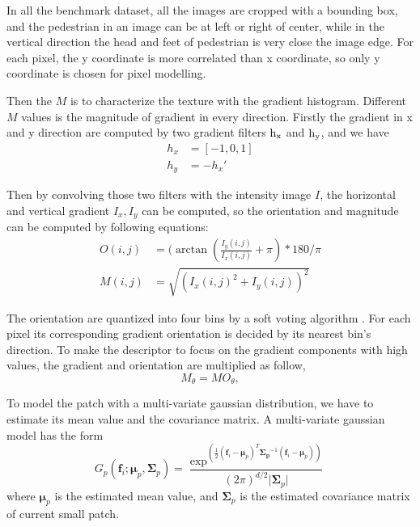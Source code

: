 In all the benchmark dataset, all the images are cropped with a bounding box, and the pedestrian in an image can be at left or right of center, while in the vertical direction the head and feet of pedestrian is very close the image edge. For each pixel, the y coordinate is more correlated than x coordinate, so only y coordinate is chosen for pixel modelling. 

Then the $M$ is to characterize the texture with the gradient histogram. Different $M$ values is the magnitude of gradient in every direction. 
Firstly the gradient in x and y direction are computed by two gradient filters $\rm{h}_x$ and $\rm{h}_y$, and we have 
\begin{equation}
\begin{aligned}
h_x &= [-1, 0, 1]\\
h_y &= -h_x'
\end{aligned}
\end{equation}

Then by convolving those two filters with the intensity image $I$, the horizontal and vertical gradient $I_x, I_y$ can be computed, so the orientation and magnitude can be computed by following equations:
\begin{equation}
\begin{aligned}
O(i,j) &= (\arctan(\frac{I_y(i,j)}{I_x(i,j)}+\pi)*180 /{\pi} \\
M(i,j) &= \sqrt{(I_x(i,j)^2 + I_y(i,j))^2}
\end{aligned}
\end{equation}

The orientation are quantized into four bins by a soft voting algorithm \cite{AutoRela}. For each pixel its corresponding gradient orientation is decided by its nearest bin's direction. To make the descriptor to focus on the gradient components with high values, the gradient and orientation are multiplied as follow,
\begin{equation}
M_{\theta} = MO_{\theta},
\end{equation}


To model the patch with a multi-variate gaussian distribution, we have to estimate its mean value and the covariance matrix. A multi-variate gaussian model has the form
\begin{equation}
G_p(\bm{f}_i;\bm{\mu}_p,\bm{\Sigma}_p) = \frac{\exp^{(\frac{1}{2}(\bm{f}_i-\bm{\mu}_p)^T\bm{\Sigma_p}^{-1}(\bm{f}_i-\bm{\mu}_p))}}{(2\pi)^{d/2}|{\bm{\Sigma}_p|}} 
\end{equation}
where $\bm {\mu}_p$ is the estimated mean value, and $\bm {\Sigma}_p $ is the estimated covariance matrix of current small patch. 

